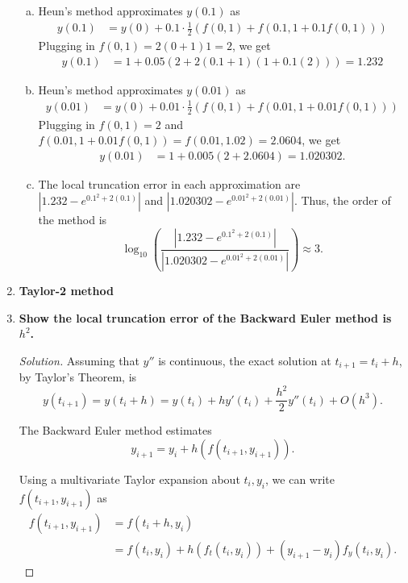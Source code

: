 \documentclass[11pt]{article}
\newenvironment{solution}
  {\renewcommand\qedsymbol{$\blacksquare$}\begin{proof}[Solution]}
  {\end{proof}}
\theoremstyle{definition}
\begin{document}
\begin{enumerate}
    \begin{enumerate}[a)]
        \item Heun's method approximates $y(0.1)$ as \begin{align*} y(0.1) &= y(0) + 0.1\cdot\frac{1}{2}(f(0, 1) + f(0.1, 1 + 0.1f(0, 1))) \end{align*}
        Plugging in $f(0, 1) = 2(0+1)1 = 2$, we get
        \begin{align*} y(0.1) &= 1 + 0.05(2 + 2(0.1 + 1)(1 + 0.1(2))) = \boxed{1.232}\end{align*}
        \item Heun's method approximates $y(0.01)$ as \begin{align*} y(0.01) &= y(0) + 0.01\cdot\frac{1}{2}(f(0, 1) + f(0.01, 1 + 0.01f(0, 1))) \end{align*}
        Plugging in $f(0, 1) = 2$ and $f(0.01, 1 + 0.01f(0,1)) = f(0.01,  1.02) = 2.0604$, we get
        \begin{align*} y(0.01) &= 1 + 0.005(2 + 2.0604) = \boxed{1.020302}.  \end{align*}
        \item The local truncation error in each approximation are $\left|1.232 - e^{0.1^2 + 2(0.1)}\right|$ and $\left|1.020302 - e^{0.01^2 + 2(0.01)} \right|.$ 
         Thus, the order of the method is \[ \log_{10} \left( \frac{\left|1.232 - e^{0.1^2 + 2(0.1)}\right|}{\left|1.020302 - e^{0.01^2 + 2(0.01)} \right|} \right) \approx \boxed{3}. \]
    \end{enumerate}

    \item \textbf{Taylor-2 method}
    
    \newpage

    \item \textbf{Show the local truncation error of the Backward Euler method is $h^2$.}
    
    \begin{solution}
    Assuming that $y''$ is continuous, the exact solution at $t_{i+1} = t_i + h$, by Taylor's Theorem, is
    \[ y(t_{i+1}) = y(t_i + h) = y(t_i) + hy'(t_i) + \frac{h^2}{2}y''(t_i) + O(h^3). \]

    The Backward Euler method estimates \[y_{i+1} = y_i + h(f(t_{i+1}, y_{i+1})).\]

    Using a multivariate Taylor expansion about $t_i, y_i$, we can write $f(t_{i+1}, y_{i+1})$ as
    \begin{align*} f(t_{i+1}, y_{i+1}) &= f(t_i + h, y_i) \\
        &= f(t_i, y_i) + h(f_t(t_i, y_i)) + (y_{i+1} - y_i)f_y(t_i, y_i).
    \end{align*}


\end{solution}
\end{enumerate}
\end{document}
